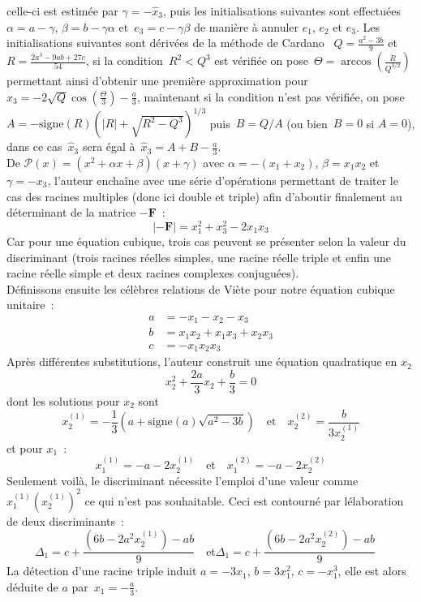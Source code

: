 \documentclass[11pt]{amsart}
\newcommand{\mb}[1]{\mathbf{#1}}
\begin{document}
celle-ci est estim\'ee par $\gamma = - \hat{x}_{3}$, puis les initialisations suivantes sont effectu\'ees~$\alpha = a - \gamma$, $\beta = b - \gamma\alpha$ et~$e_{3} = c - \gamma\beta$ de mani\`ere \`a annuler $e_{1}$,
$e_{2}$ et $e_{3}$. Les initialisations suivantes sont d\'eriv\'ees de la m\'ethode de Cardano~ $Q = \frac{a^{2} - 3b}{9}$ et~$R = \frac{2a^3-9ab+27c}{54}$, si la condition~$R^{2}<Q^{3}$ est v\'erifi\'ee on pose~$\Theta=\arccos\left(\frac{R}{Q^{3/2}}\right)$
permettant ainsi d'obtenir une premi\`ere approximation pour $\hat{x}_{3}=-2\sqrt{Q}\cos\left(\frac{\Theta}{3}\right) - \frac{a}{3}$, maintenant si la condition n'est pas v\'erifi\'ee, on pose~$A=-\text{signe}(R)\left(|R|+\sqrt{R^{2}-Q^{3}}\right)^{1/3}$
puis~$B = Q/A$ (ou bien~$B=0$ si $A=0$), dans ce cas~$\hat{x}_{3}$ sera \'egal \`a~$\hat{x}_{3}=A+B-\frac{a}{3}$.\\

De $\mathcal{P}(x)=(x^2 + \alpha{}x + \beta)(x+\gamma)$ avec $\alpha=-(x_{1}+x_{2})$, $\beta=x_{1}x_{2}$ et $\gamma=-x_{3}$, l'auteur encha\^ine avec une s\'erie d'op\'erations
permettant de traiter le cas des racines multiples (donc ici double et triple) afin d'aboutir finalement au d\'eterminant de la matrice $-\mb{F}$~:
$$|-\mb{F}| = x_{1}^{2}+x_{3}^{2}-2x_{1}x_{3}$$
Car pour une \'equation cubique, trois cas peuvent se pr\'esenter selon la valeur du discriminant (trois racines r\'eelles simples, une racine r\'eelle triple et enfin une racine r\'eelle simple et deux
racines complexes conjugu\'ees).\\

D\'efinissons ensuite les c\'el\`ebres relations de Vi\`ete pour notre \'equation cubique unitaire~:
\[
\begin{split}
a &= -x_{1}-x_{2}-x_{3}\\
b &=  x_{1}x_{2}+x_{1}x_{3}+x_{2}x_{3}\\
c &= -x_{1}x_{2}x_{3}
\end{split}
\]
Apr\`es diff\'erentes substitutions, l'auteur construit une \'equation quadratique en $x_{2}$
$$x_{2}^{2}+\frac{2a}{3}x_{2}+\frac{b}{3}=0$$
dont les solutions pour $x_{2}$ sont
$$x_{2}^{(1)} = - \frac{1}{3}\left(a + \text{signe}(a)\sqrt{a^{2}-3b}\right) \quad \text{et} \quad x_{2}^{(2)} = \frac{b}{3x_{2}^{(1)}}$$
et pour $x_{1}$~:
$$x_{1}^{(1)} = -a - 2x_{2}^{(1)} \quad \text{et} \quad x_{1}^{(2)} = -a - 2x_{2}^{(2)}$$
Seulement voil\`a, le discriminant n\'ecessite l'emploi d'une valeur comme $x_{1}^{(1)}\left(x_{2}^{(1)}\right)^{2}$ ce qui n'est pas souhaitable.
Ceci est contourn\'e par l\'elaboration de deux discriminants~:
$$\Delta_{1} = c + \frac{(6b - 2a^{2}x_{2}^{(1)}) - ab}{9} \quad \text{et} \Delta_{1} = c + \frac{(6b - 2a^{2}x_{2}^{(2)}) - ab}{9}\quad$$
La d\'etection d'une racine triple induit $a=-3x_{1}$, $b=3x_{1}^{2}$, $c=-x_{1}^{3}$, elle est alors d\'eduite de $a$ par~$x_{1} = -\frac{a}{3}$.\\
\end{document}
